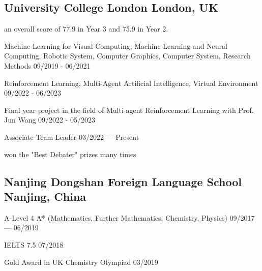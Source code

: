 
\subsection{
    University College London 
    \hfill London, UK
}
    \begin{zitemize}
        \item   an overall score of 77.9 in Year 3 and 75.9 in Year 2.  
        \item   Machine Learning for Visual Computing, 
                Machine Learning and Neural Computing, 
                Robotic System, 
                Computer Graphics, 
                Computer System,
                Research Methods 
                \hfill 09/2019 - 06/2021
        \item   Reinforcement Learning,    
                Multi-Agent Artificial Intelligence,
                Virtual Environment 
                \hfill 09/2022 - 06/2023
        \item   Final year project in the field of Multi-agent Reinforcement Learning
                with Prof. Jun Wang
                \hfill 09/2022 - 05/2023
    \end{zitemize}

    \begin{zitemize}
        \item   Associate Team Leader 
                \hfill 03/2022 --- Present
        \item   won the "Best Debater" prizes many times
    \end{zitemize}


\vspace{0.3em}


\subsection{
    Nanjing Dongshan Foreign Language School 
    \hfill Nanjing, China
}
    \begin{zitemize}
        \item   A-Level 4 A* (Mathematics, Further Mathematics, Chemistry, Physics) 
                \hfill 09/2017 --- 06/2019 
        \item   IELTS 7.5 
                \hfill 07/2018 
        \item   Gold Award in UK Chemistry Olympiad
                \hfill 03/2019
    \end{zitemize}


